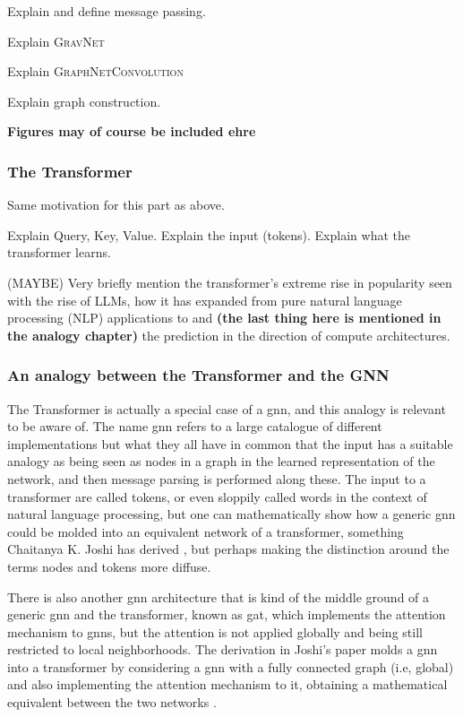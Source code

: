 Explain and define message passing.

Explain \textsc{GravNet}

Explain \textsc{GraphNetConvolution} \cite{qasim2019-gravnet}


Explain graph construction.

\textbf{Figures may of course be included ehre}

\subsubsection{The Transformer}

Same motivation for this part as above.

Explain Query, Key, Value. Explain the input (tokens). Explain what the transformer learns. 

(MAYBE) Very briefly mention the transformer's extreme rise in popularity seen with the rise of LLMs, how it has expanded from pure natural language processing (NLP) applications to and \textbf{(the last thing here is mentioned in the analogy chapter)} the prediction in the direction of compute architectures.


\subsubsection{An analogy between the Transformer and the GNN}

The Transformer is actually a special case of a \gls{gnn}, and this analogy is relevant to be aware of. The name \gls{gnn} refers to a large catalogue of different implementations but what they all have in common that the input has a suitable analogy as being seen as nodes in a graph in the learned representation of the network, and then message parsing is performed along these. The input to a transformer are called tokens, or even sloppily called words in the context of natural language processing, but one can mathematically show how a generic \gls{gnn} could be molded into an equivalent network of a transformer, something Chaitanya K. Joshi has derived \cite{joshi2025transformersgnn}, but perhaps making the distinction around the terms nodes and tokens more diffuse. 

There is also another \gls{gnn} architecture that is kind of the middle ground of a generic \gls{gnn} and the transformer, known as \gls{gat}, which implements the attention mechanism to \gls{gnn}s, but the attention is not applied globally and being still restricted to local neighborhoods. The derivation in Joshi's paper molds a \gls{gnn} into a transformer by considering a \gls{gnn} with a fully connected graph (i.e, global) and also implementing the attention mechanism to it, obtaining a mathematical equivalent between the two networks \cite{joshi2025transformersgnn}. 

